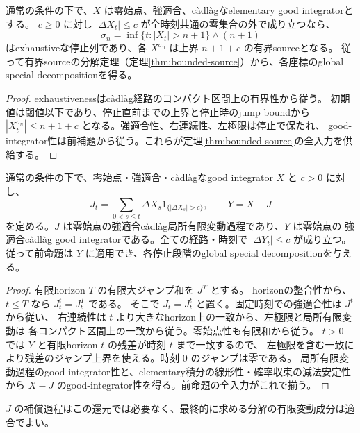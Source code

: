 \begin{proposition}
通常の条件の下で、$X$ は零始点、強適合、càdlàgなelementary good integratorとする。
$c\ge0$ に対し $|\Delta X_t|\le c$ が全時刻共通の零集合の外で成り立つなら、
\[
 \sigma_n=\inf\{t:|X_t|>n+1\}\wedge(n+1)
\]
はexhaustiveな停止列であり、各 $X^{\sigma_n}$ は上界 $n+1+c$ の有界sourceとなる。
従って有界sourceの分解定理（定理\ref{thm:bounded-source}）から、各座標のglobal special decompositionを得る。
\end{proposition}
\begin{proof}
exhaustivenessはcàdlàg経路のコンパクト区間上の有界性から従う。
初期値は閾値以下であり、停止直前までの上界と停止時のjump boundから
$|X^{\sigma_n}_t|\le n+1+c$ となる。強適合性、右連続性、左極限は停止で保たれ、
good-integrator性は前補題から従う。これらが定理\ref{thm:bounded-source}の全入力を供給する。
\end{proof}

\begin{proposition}
通常の条件の下で、零始点・強適合・càdlàgなgood integrator $X$ と $c>0$ に対し、
\[
 J_t=\sum_{0<s\le t}\Delta X_s1_{\{|\Delta X_s|>c\}},\qquad Y=X-J
\]
を定める。$J$ は零始点の強適合càdlàg局所有限変動過程であり、$Y$ は零始点の
強適合càdlàg good integratorである。全ての経路・時刻で $|\Delta Y_t|\le c$ が成り立つ。
従って前命題は $Y$ に適用でき、各停止段階のglobal special decompositionを与える。
\end{proposition}
\begin{proof}
有限horizon $T$ の有限大ジャンプ和を $J^T$ とする。
horizonの整合性から、$t\le T$ なら $J^t_t=J^T_t$ である。
そこで $J_t=J^t_t$ と置く。固定時刻での強適合性は $J^t$ から従い、
右連続性は $t$ より大きなhorizon上の一致から、左極限と局所有限変動は
各コンパクト区間上の一致から従う。零始点性も有限和から従う。
$t>0$ では $Y$ と有限horizon $t$ の残差が時刻 $t$ まで一致するので、
左極限を含む一致により残差のジャンプ上界を使える。時刻 $0$ のジャンプは零である。
局所有限変動過程のgood-integrator性と、elementary積分の線形性・確率収束の減法安定性から
$X-J$ のgood-integrator性を得る。前命題の全入力がこれで揃う。
\end{proof}
$J$ の補償過程はこの還元では必要なく、最終的に求める分解の有限変動成分は適合でよい。

